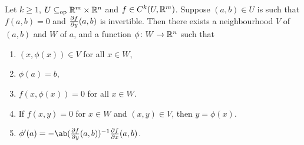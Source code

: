 \begin{theorem*} \label{thm:imft}
    Let $k \ge 1$, $U \subseteq_{\mathrm{op}} \mathbb{R}^m \times \mathbb{R}^n$ and $f \in C^k(U, \mathbb{R}^m)$.
    Suppose $(a, b) \in U$ is such that $f(a, b) = 0$ and
    $\pdv{f}{y}(a, b)$ is invertible.
    Then there exists a neighbourhood $V$ of $(a, b)$ and $W$ of $a$,
    and a function $\phi\colon W \to \mathbb{R}^n$ such that
    \begin{enumerate}
        \item $(x, \phi(x)) \in V$ for all $x \in W$,
        \item $\phi(a) = b$,
        \item $f(x, \phi(x)) = 0$ for all $x \in W$.
        \item If $f(x, y) = 0$ for $x \in W$ and $(x, y) \in V$,
            then $y = \phi(x)$.
        \item $\phi'(a) = -\ab({\pdv fy(a, b)})^{-1} \pdv fx(a, b)$.
    \end{enumerate}
\end{theorem*}
